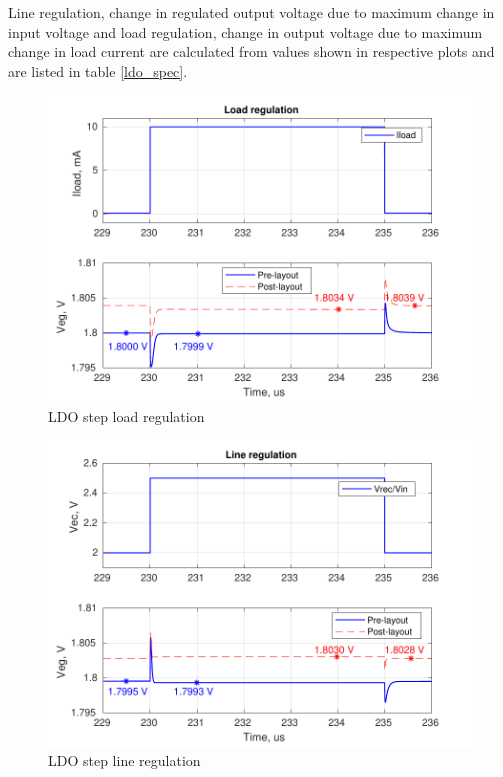 \documentclass[12pt,a4paper,UKenglish]{article}
\begin{document}
  Line regulation, change in regulated output voltage due to maximum change in input voltage and load regulation, change in output voltage due to maximum change in 
  load current are calculated from values shown in respective plots and are listed in table \ref{ldo_spec}.

\begin{figure}[H] %
   \centering
   \includegraphics[width=\textwidth]{img/ldo_loadr_both.pdf} 
   \caption{LDO step load regulation}
   \label{fig:ldo_loadr}
\end{figure}

\begin{figure}[H] %
   \centering
   \includegraphics[width=\textwidth]{img/ldo_liner_both.pdf} 
   \caption{LDO step line regulation}
   \label{fig:ldo_liner}
\end{figure}
\end{document}
